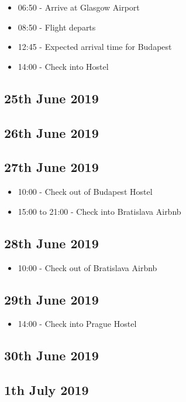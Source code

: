 \documentclass[a4paper,12pt]{article}
\begin{document}
    \begin{itemize}
    	\item 06:50 - Arrive at Glasgow Airport
    	\item 08:50 - Flight departs
    	\item 12:45 - Expected arrival time for Budapest 
    	\item 14:00 - Check into Hostel
   \end{itemize}
   
\subsection*{25th June 2019}
\subsection*{26th June 2019}
\subsection*{27th June 2019}

    \begin{itemize}
    	\item 10:00 - Check out of Budapest Hostel
    	\item 15:00 to 21:00 - Check into Bratislava Airbnb
    \end{itemize}


\subsection*{28th June 2019}
     \begin{itemize}
    	\item 10:00 - Check out of Bratislava Airbnb
     \end{itemize}  

\subsection*{29th June 2019}
    \begin{itemize}
	    \item 14:00 - Check into Prague Hostel
    \end{itemize}  
\subsection*{30th June 2019} 
\subsection*{1th July 2019}
\end{document}
